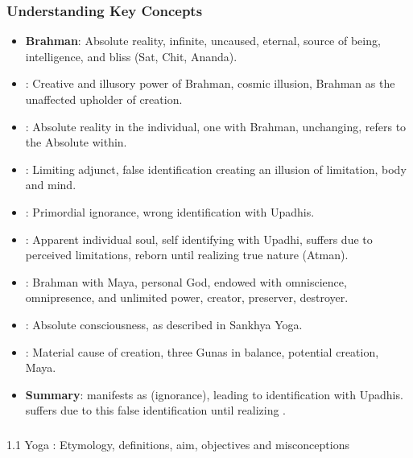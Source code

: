 \begin{frame}[fragile]\frametitle{Understanding Key Concepts}
      \begin{itemize}
        \item \textbf{Brahman}: Absolute reality, infinite, uncaused, eternal, source of being, intelligence, and bliss (Sat, Chit, Ananda).
        \item \textbf{}: Creative and illusory power of Brahman, cosmic illusion, Brahman as the unaffected upholder of creation.
        \item \textbf{}: Absolute reality in the individual, one with Brahman, unchanging, refers to the Absolute within.
        \item \textbf{}: Limiting adjunct, false identification creating an illusion of limitation, body and mind.
        \item \textbf{}: Primordial ignorance, wrong identification with Upadhis.
        \item \textbf{}: Apparent individual soul, self identifying with Upadhi, suffers due to perceived limitations, reborn until realizing true nature (Atman).
        \item \textbf{}: Brahman with Maya, personal God, endowed with omniscience, omnipresence, and unlimited power, creator, preserver, destroyer.
        \item \textbf{}: Absolute consciousness, as described in Sankhya Yoga.
        \item \textbf{}: Material cause of creation, three Gunas in balance, potential creation, Maya.
        \item \textbf{Summary}:  manifests as  (ignorance), leading to identification with Upadhis.  suffers due to this false identification until realizing .
      \end{itemize}
\end{frame}



\begin{frame}[fragile]\frametitle{}
\begin{center}
{\Large 1.1 Yoga : Etymology, definitions, aim, objectives and misconceptions}
\end{center}
\end{frame}

